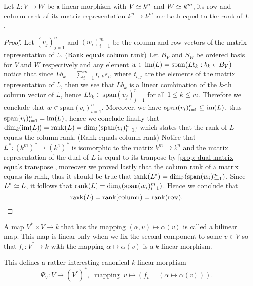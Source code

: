 \begin{proposition}
  \label{prop: column and row rank equal the rank}
  Let \(L: V \to W\) be a linear morphism with \(V \simeq k^n\) and \(W \simeq
  k^m\), its row and column rank of its matrix representation \(k^n \to k^m\)
  are both equal to the rank of \(L\).
\end{proposition}

\begin{proof}
  Let \((v_j)_{j=1}^n\) and  \((w_i)_{i=1}^m\) be the column and row vectors of
  the matrix representation of \(L\).
  (Rank equals column rank) Let \(B_V\) and \(S_W\) be ordered basis for \(V\)
  and \(W\) respectively and any element \(w \in \operatorname{im}(L) = \mathrm{span}(Lb_k :
  b_k \in B_V)\) notice that since \(Lb_k = \sum_{i=1}^m t_{i, k} s_i\), where
  \(t_{i,j}\) are the elements of the matrix representation of \(L\), then we
  see that \(Lb_k\) is a linear combination of the \(k\)-th column vector of
  \(L\), hence \(Lb_k \in \mathrm{span}(v_j)_{j=1}^n\) for all \(1 \leq k \leq
  m\). Therefore we conclude that \(w \in \mathrm{span}(v_i)_{i=1}^n\).
  Moreover, we have \(\mathrm{span}(v_i)_{i=1}^n \subseteq \operatorname{im}(L)\), thus
  \(\mathrm{span}(v_i)_{i=1}^n = \operatorname{im}(L)\), hence we conclude finally that
  \(\dim_k(\operatorname{im}(L)) = \operatorname{rank}(L) = \dim_k(\mathrm{span}(v_i)_{i=1}^n)\) which
  states that the rank of \(L\) equals the column rank.
  (Rank equals column rank) Notice that \(L^\ast : (k^m)^\ast \to (k^n)^\ast\)
  is isomorphic to the matrix \(k^m \to k^n\) and the matrix representation of
  the dual of \(L\) is equal to its tranpose by \ref{prop: dual matrix equals
  transpose}, moreover we proved lastly that the column rank of a matrix equals
  its rank, thus it should be true that \(\operatorname{rank}(L^\ast) =
  \dim_k(\mathrm{span}(w_i)_{i=1}^m)\). Since \(L^\ast \simeq L\), it follows that
  \(\operatorname{rank}(L) = \dim_k(\mathrm{span}(w_i)_{i=1}^m)\). Hence we conclude that
  \[
    \operatorname{rank}(L) = \operatorname{rank}(\text{column}) = \operatorname{rank}(\text{row}).
  \]
\end{proof}

\begin{definition}\label{def: bilinear map}
  A map \(V^\ast \times V \to k\) that has the mapping \((\alpha, v) \mapsto
  \alpha(v)\) is called a bilinear map. This map is linear only when we fix the
  second component to some \(v \in V\) so that \(f_v: V^\ast \to k\) with the
  mapping \(\alpha \mapsto \alpha(v)\) is a \(k\)-linear morphism.
\end{definition}

This defines a rather interesting canonical \(k\)-linear morphism
\[
  \Psi_V : V \to (V^\ast)^\ast,\
  \text{ mapping }\ v \mapsto (f_v = (\alpha \mapsto \alpha(v))).
\]


